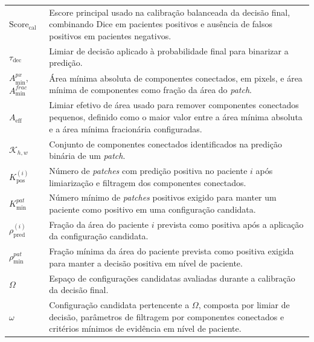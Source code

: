 \begin{longtable}{p{3.0cm}p{12.0cm}}
  $\mathrm{Score}_{\mathrm{cal}}$ &
  Escore principal usado na calibração balanceada da decisão final, combinando
  Dice em pacientes positivos e ausência de falsos positivos em pacientes
  negativos.\\

  $\tau_{\mathrm{dec}}$ &
  Limiar de decisão aplicado à probabilidade final para binarizar a predição.\\

  $A_{\min}^{px}$, $A_{\min}^{frac}$ &
  Área mínima absoluta de componentes conectados, em pixels, e área mínima de
  componentes como fração da área do \textit{patch}.\\

  $A_{\mathrm{eff}}$ &
  Limiar efetivo de área usado para remover componentes conectados pequenos,
  definido como o maior valor entre a área mínima absoluta e a área mínima
  fracionária configuradas.\\

  $\mathcal{K}_{h,w}$ &
  Conjunto de componentes conectados identificados na predição binária de um
  \textit{patch}.\\

  $K_{\mathrm{pos}}^{(i)}$ &
  Número de \textit{patches} com predição positiva no paciente $i$ após
  limiarização e filtragem dos componentes conectados.\\

  $K_{\min}^{pat}$ &
  Número mínimo de \textit{patches} positivos exigido para manter um paciente
  como positivo em uma configuração candidata.\\

  $\rho_{\mathrm{pred}}^{(i)}$ &
  Fração da área do paciente $i$ prevista como positiva após a aplicação da
  configuração candidata.\\

  $\rho_{\min}^{pat}$ &
  Fração mínima da área do paciente prevista como positiva exigida para manter a
  decisão positiva em nível de paciente.\\

  $\Omega$ &
  Espaço de configurações candidatas avaliadas durante a calibração da decisão
  final.\\

  $\omega$ &
  Configuração candidata pertencente a $\Omega$, composta por limiar de decisão,
  parâmetros de filtragem por componentes conectados e critérios mínimos de
  evidência em nível de paciente.\\



\end{longtable}
